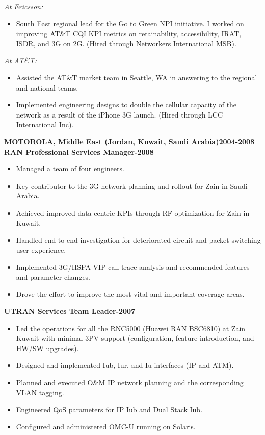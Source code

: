 \documentclass{article}
\begin{document}
\textit{At Ericsson:}
\begin{itemize}
\item South East regional lead for the Go to Green NPI initiative.  I worked on improving AT\&T CQI KPI metrics on retainability, accessibility, IRAT, ISDR, and 3G on 2G. (Hired through Networkers International MSB).
\end{itemize}
\textit{At AT\&T:}
\begin{itemize}
\item Assisted the AT\&T market team in Seattle, WA in answering to the regional and national teams.
\item Implemented engineering designs to double the cellular capacity of the network as a result of the iPhone 3G launch. (Hired through LCC International Inc).
\end{itemize}
\newpage\noindent
\textbf{MOTOROLA, Middle East (Jordan, Kuwait, Saudi Arabia)\hfill 2004-2008}\\
\textbf{RAN Professional Services Manager\hfill{}-2008}
\begin{itemize}
\item Managed a team of four engineers.
\item Key contributor to the 3G network planning and rollout for Zain in Saudi Arabia.
\item Achieved improved data-centric KPIs through RF optimization for Zain in Kuwait.
\item Handled end-to-end investigation for deteriorated circuit and packet switching user experience. 
\item Implemented 3G/HSPA VIP call trace analysis and recommended features and parameter changes.
\item Drove the effort to improve the most vital and important coverage areas. 
\end{itemize}
\textbf{UTRAN Services Team Leader\hfill{}-2007}
\begin{itemize}
\item Led the operations for all the RNC5000 (Huawei RAN BSC6810) at Zain Kuwait with minimal 3PV support (configuration, feature introduction, and HW/SW upgrades).
\item Designed and implemented Iub, Iur, and Iu interfaces (IP and ATM). 
\item Planned and executed O\&M IP network planning and the corresponding VLAN tagging. 
\item Engineered QoS parameters for IP Iub and Dual Stack Iub. 
\item Configured and administered OMC-U running on Solaris.
\end{itemize}
\end{document}
